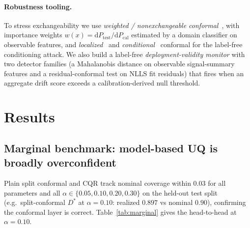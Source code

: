 \documentclass[11pt]{article}
\newcommand{\Dstar}{D^{*}}
\begin{document}
\paragraph{Robustness tooling.}
To stress exchangeability we use \emph{weighted / nonexchangeable
conformal}~\citep{tibshirani2019,barber2023}, with importance weights
$w(x)=\mathrm{d}P_{\text{test}}/\mathrm{d}P_{\text{cal}}$ estimated by a domain
classifier on observable features, and \emph{localized}~\citep{guan2023} and
\emph{conditional}~\citep{gibbs2023} conformal for the label-free conditioning
attack. We also build a label-free \emph{deployment-validity monitor} with two
detector families (a Mahalanobis distance on observable signal-summary features and
a residual-conformal test on NLLS fit residuals) that fires when an aggregate drift
score exceeds a calibration-derived null threshold.

\section{Results}

\subsection{Marginal benchmark: model-based UQ is broadly overconfident}
\label{sec:marginal}
Plain split conformal and CQR track nominal coverage within $0.03$ for all
parameters and all $\alpha\in\{0.05,0.10,0.20,0.30\}$ on the held-out test split
(e.g.\ split-conformal $\Dstar$ at $\alpha{=}0.10$: realized $0.897$ vs nominal
$0.90$), confirming the conformal layer is correct. Table~\ref{tab:marginal} gives
the head-to-head at $\alpha=0.10$.
\end{document}
